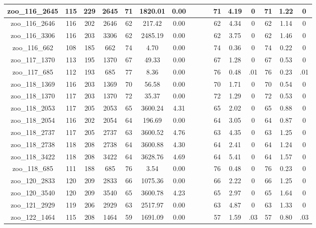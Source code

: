 \begin{landscape}
\begin{longtable}{|c|c|c|c|c|c|c|c|c|c|c|c|c|c|c|c|}
zoo\_116\_2645 & 115 & 229 & 2645 & 71 & 1820.01 & 0.00 &  &  &  & 71 & 4.19 & 0 & 71 & 1.22 & 0 \\ \hline 
zoo\_116\_2646 & 116 & 202 & 2646 & 62 & 217.42 & 0.00 &  &  &  & 62 & 4.34 & 0 & 62 & 1.14 & 0 \\ \hline 
zoo\_116\_3306 & 116 & 203 & 3306 & 62 & 2485.19 & 0.00 &  &  &  & 62 & 3.75 & 0 & 62 & 1.46 & 0 \\ \hline 
zoo\_116\_662 & 108 & 185 & 662 & 74 & 4.70 & 0.00 &  &  &  & 74 & 0.36 & 0 & 74 & 0.22 & 0 \\ \hline 
zoo\_117\_1370 & 113 & 195 & 1370 & 67 & 49.33 & 0.00 &  &  &  & 67 & 1.28 & 0 & 67 & 0.53 & 0 \\ \hline 
zoo\_117\_685 & 112 & 193 & 685 & 77 & 8.36 & 0.00 &  &  &  & 76 & 0.48 & .01 & 76 & 0.23 & .01 \\ \hline 
zoo\_118\_1369 & 116 & 203 & 1369 & 70 & 56.58 & 0.00 &  &  &  & 70 & 1.71 & 0 & 70 & 0.54 & 0 \\ \hline 
zoo\_118\_1370 & 117 & 203 & 1370 & 72 & 35.37 & 0.00 &  &  &  & 72 & 1.29 & 0 & 72 & 0.53 & 0 \\ \hline 
zoo\_118\_2053 & 117 & 205 & 2053 & 65 & 3600.24 & 4.31 &  &  &  & 65 & 2.02 & 0 & 65 & 0.88 & 0 \\ \hline 
zoo\_118\_2054 & 116 & 202 & 2054 & 64 & 196.69 & 0.00 &  &  &  & 64 & 3.05 & 0 & 64 & 0.87 & 0 \\ \hline 
zoo\_118\_2737 & 117 & 205 & 2737 & 63 & 3600.52 & 4.76 &  &  &  & 63 & 4.35 & 0 & 63 & 1.25 & 0 \\ \hline 
zoo\_118\_2738 & 118 & 208 & 2738 & 64 & 3600.88 & 4.30 &  &  &  & 64 & 2.41 & 0 & 64 & 1.24 & 0 \\ \hline 
zoo\_118\_3422 & 118 & 208 & 3422 & 64 & 3628.76 & 4.69 &  &  &  & 64 & 5.41 & 0 & 64 & 1.57 & 0 \\ \hline 
zoo\_118\_685 & 111 & 188 & 685 & 76 & 3.54 & 0.00 &  &  &  & 76 & 0.48 & 0 & 76 & 0.23 & 0 \\ \hline 
zoo\_120\_2833 & 120 & 209 & 2833 & 66 & 1075.36 & 0.00 &  &  &  & 66 & 2.22 & 0 & 66 & 1.25 & 0 \\ \hline 
zoo\_120\_3540 & 120 & 209 & 3540 & 65 & 3600.78 & 4.23 &  &  &  & 65 & 2.97 & 0 & 65 & 1.64 & 0 \\ \hline 
zoo\_121\_2929 & 119 & 206 & 2929 & 63 & 2517.97 & 0.00 &  &  &  & 63 & 4.87 & 0 & 63 & 1.33 & 0 \\ \hline 
zoo\_122\_1464 & 115 & 208 & 1464 & 59 & 1691.09 & 0.00 &  &  &  & 57 & 1.59 & .03 & 57 & 0.80 & .03 \\ \hline 

\end{longtable}
\end{landscape}
